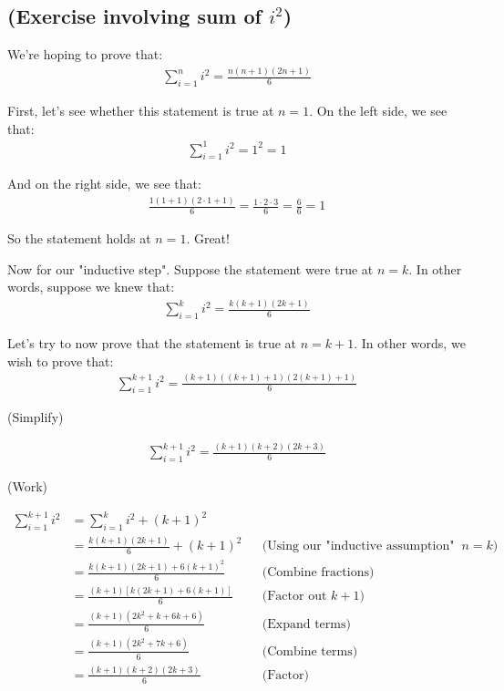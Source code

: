 \documentclass{book}
\begin{document}
\subsection{(Exercise involving sum of $i^2$)}


We're hoping to prove that:
\begin{align*}
\sum_{i=1}^{n} i^2 = \frac{n(n+1)(2n+1)}{6}
\end{align*}

First, let's see whether this statement is true at $n = 1$. On the left side, we see that:
\begin{align*}
\sum_{i=1}^{1} i^2 = 1^2 = 1
\end{align*}

And on the right side, we see that:
\begin{align*}
\frac{1(1+1)(2 \cdot 1+1)}{6} = \frac{1 \cdot 2 \cdot 3}{6} = \frac{6}{6} = 1
\end{align*}

So the statement holds at $n = 1$. Great!


Now for our "inductive step". Suppose the statement were true at $n = k$. In other words, suppose we knew that:
\begin{align*}
\sum_{i=1}^{k} i^2 = \frac{k(k+1)(2k+1)}{6}
\end{align*}

Let's try to now prove that the statement is true at $n = k + 1$. In other words, we wish to prove that:
\begin{align*}
\sum_{i=1}^{k+1} i^2 = \frac{(k+1)((k+1)+1)(2(k+1)+1)}{6}
\end{align*}

(Simplify)

\begin{align*}
\sum_{i=1}^{k+1} i^2 = \frac{(k+1)(k+2)(2k+3)}{6}
\end{align*}

(Work)

\begin{align*}
\sum_{i=1}^{k+1} i^2 &= \sum_{i=1}^{k} i^2 + (k+1)^2 \\
&= \frac{k(k+1)(2k+1)}{6} + (k+1)^2 && \text{(Using our "inductive assumption" that the statement is true at $n = k$)} \\
&= \frac{k(k+1)(2k+1) + 6(k+1)^2}{6} && \text{(Combine fractions)} \\
&= \frac{(k+1)\left[k(2k+1) + 6(k+1)\right]}{6} && \text{(Factor out $k+1$)} \\
&= \frac{(k+1)(2k^2 + k + 6k + 6)}{6} && \text{(Expand terms)} \\
&= \frac{(k+1)(2k^2 + 7k + 6)}{6} && \text{(Combine terms)} \\
&= \frac{(k+1)(k+2)(2k+3)}{6} && \text{(Factor)} \\
\end{align*}
\end{document}
